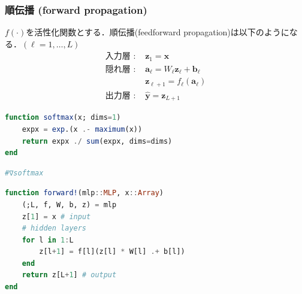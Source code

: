 \subsubsection{順伝播 (forward propagation)}
$f(\cdot)$を活性化関数とする．順伝播(feedforward propagation)は以下のようになる．$(\ell=1,\ldots,L)$
\begin{align}
\text{入力層 : }&\mathbf{z}_1=\mathbf{x}\\
\text{隠れ層 : }&\mathbf{a}_\ell=W_\ell \mathbf{z}_\ell +\mathbf{b}_\ell\\
&\mathbf{z}_{\ell+1}=f_\ell\left(\mathbf{a}_\ell\right)\\
\text{出力層 : }&\hat{\mathbf{y}}=\mathbf{z}_{L+1}
\end{align}
\begin{lstlisting}[language=julia]
function softmax(x; dims=1)
    expx = exp.(x .- maximum(x))
    return expx ./ sum(expx, dims=dims)
end
\end{lstlisting}
\begin{lstlisting}[language=julia]
#∇softmax
\end{lstlisting}
\begin{lstlisting}[language=julia]
function forward!(mlp::MLP, x::Array)
    (;L, f, W, b, z) = mlp
    z[1] = x # input
    # hidden layers
    for l in 1:L
        z[l+1] = f[l](z[l] * W[l] .+ b[l])
    end
    return z[L+1] # output
end
\end{lstlisting}
